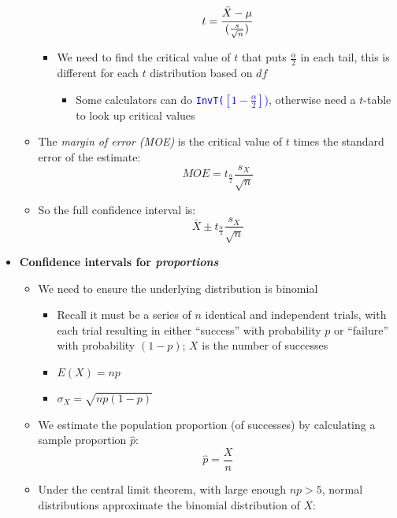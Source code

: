 \documentclass{article}
\begin{document}
\begin{itemize}
\begin{itemize}
\begin{itemize}
		\begin{equation*}
		t= \cfrac{\bar{X}-\mu}{(\frac{s}{\sqrt{n}})}
		\end{equation*}
		\item We need to find the critical value of $t$ that puts $\frac{\alpha}{2}$ in each tail, this is different for each $t$ distribution based on $df$
		\begin{itemize}
			\item Some calculators can do \textcolor{blue}{\texttt{InvT($[1-\frac{\alpha}{2}]$})}, otherwise need a $t$-table to look up critical values
		\end{itemize}
	\end{itemize}
		\item The \emph{margin of error (MOE)} is the critical value of $t$ times the standard error of the estimate: 
		\begin{equation*}
			MOE=t_{\frac{\alpha}{2}}\frac{s_X}{\sqrt{n}}	
		\end{equation*}
		\item So the full confidence interval is: 
			\begin{equation*}
			\bar{X} \pm t_{\frac{\alpha}{2}}\frac{s_X}{\sqrt{n}}	
			\end{equation*}
	\end{itemize}
	\item \textbf{Confidence intervals for \emph{proportions}}
	\begin{itemize}
		\item We need to ensure the underlying distribution is binomial
		\begin{itemize}
			\item Recall it must be a series of $n$ identical and independent trials, with each trial resulting in either ``success'' with probability $p$ or ``failure'' with probability $(1-p)$; $X$ is the number of successes
			\item $E(X)=np$
			\item $\sigma_X = \sqrt{np(1-p)}$
		\end{itemize}
		\item We estimate the population proportion (of successes) by calculating a sample proportion $\hat{p}$:
		\begin{equation*}
		\hat{p}=\frac{X}{n}	
		\end{equation*}
		\item Under the central limit theorem, with large enough $np>5$, normal distributions approximate the binomial distribution of $X$: 
		\begin{equation*}

\end{equation*}
\end{itemize}
\end{itemize}
\end{document}
